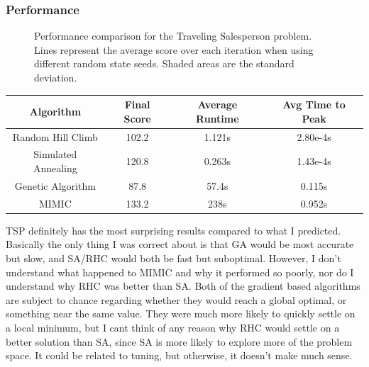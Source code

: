 \documentclass[
	letterpaper, %
]{mlreport}
\begin{document}
\subsubsection{Performance}
\begin{figure}
	\centering
	{}
	\caption{Performance comparison for the Traveling Salesperson problem. Lines represent the average score over each iteration when using different random state seeds. Shaded areas are the standard deviation.}
	\label{fig:fig5}
\end{figure}
\begin{center}
	\begin{tabular}{|c||c|c|c|}
	 \hline
	 Algorithm & Final Score & Average Runtime & Avg Time to Peak \\
	 \hline\hline
	 Random Hill Climb & 102.2 & 1.121s & 2.80e-4s  \\
	 \hline
	 Simulated Annealing & 120.8 & 0.263s & 1.43e-4s  \\
	 \hline
	 Genetic Algorithm & 87.8 & 57.4s & 0.115s  \\
	 \hline
	 MIMIC & 133.2 & 238s & 0.952s  \\
	 \hline
	\end{tabular}
	\label{table:table3}
\end{center}
TSP definitely has the most surprising results compared to what I predicted. Basically the only thing I was correct about is that GA would be most accurate but slow, and SA/RHC would both be fast but suboptimal. However, I don't understand what happened to MIMIC and why it performed so poorly, nor do I understand why RHC was better than SA. Both of the gradient based algorithms are subject to chance regarding whether they would reach a global optimal, or something near the same value. They were much more likely to quickly settle on a local minimum, but I cant think of any reason why RHC would settle on a better solution than SA, since SA is more likely to explore more of the problem space. It could be related to tuning, but otherwise, it doesn't make much sense.
\end{document}
